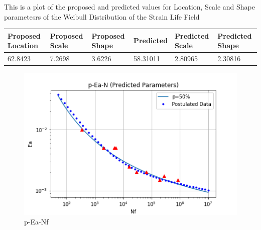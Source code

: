 \documentclass[11pt]{article}
\begin{document}
This is a plot of the proposed and predicted values for Location, Scale
and Shape parametesrs of the Weibull Distribution of the Strain Life
Field

\begin{longtable}[]{@{}llllll@{}}
\toprule
\begin{minipage}[b]{0.14\columnwidth}\raggedright
Proposed Location\strut
\end{minipage} & \begin{minipage}[b]{0.14\columnwidth}\raggedright
Proposed Scale\strut
\end{minipage} & \begin{minipage}[b]{0.14\columnwidth}\raggedright
Proposed Shape\strut
\end{minipage} & \begin{minipage}[b]{0.14\columnwidth}\raggedright
Predicted\strut
\end{minipage} & \begin{minipage}[b]{0.14\columnwidth}\raggedright
Predicted Scale\strut
\end{minipage} & \begin{minipage}[b]{0.14\columnwidth}\raggedright
Predicted Shape\strut
\end{minipage}\tabularnewline
\midrule
\endhead
\begin{minipage}[t]{0.14\columnwidth}\raggedright
62.8423\strut
\end{minipage} & \begin{minipage}[t]{0.14\columnwidth}\raggedright
7.2698\strut
\end{minipage} & \begin{minipage}[t]{0.14\columnwidth}\raggedright
3.6226\strut
\end{minipage} & \begin{minipage}[t]{0.14\columnwidth}\raggedright
58.31011\strut
\end{minipage} & \begin{minipage}[t]{0.14\columnwidth}\raggedright
2.80965\strut
\end{minipage} & \begin{minipage}[t]{0.14\columnwidth}\raggedright
2.30816\strut
\end{minipage}\tabularnewline
\bottomrule
\end{longtable}

\begin{figure}
\centering
\includegraphics{images/p-Ea-Nf_predpara.png}
\caption{p-Ea-Nf}
\end{figure}
\end{document}
